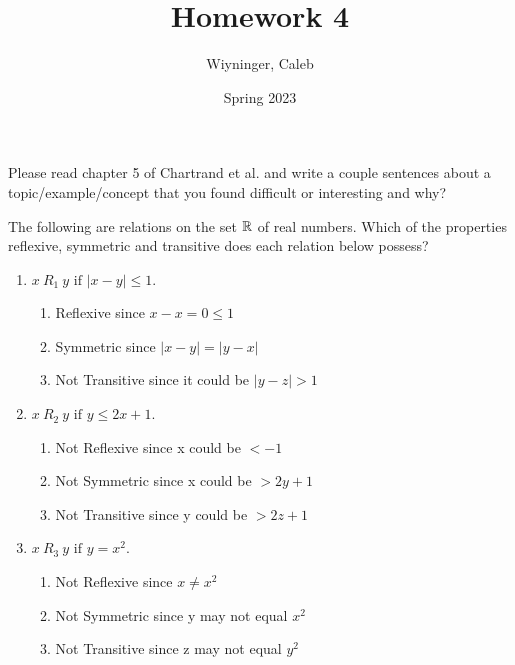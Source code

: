 \documentclass{homework}
\author{Wiyninger, Caleb}  %
\date{Spring 2023}  %
\title{Homework 4}
\begin{document}
 \maketitle

\question Please read chapter 5 of Chartrand et al. and write a couple sentences about a topic/example/concept that you found difficult or interesting and why?


\question The following are relations on the set $\mathbb{R}$ of real numbers. Which of the properties reflexive, symmetric and transitive does each relation below possess?
\begin{enumerate}[label=(\alph*)]
	\item $x \ R_1 \ y \text{ if } |x - y| \leq 1$.
        \begin{sol}
            \begin{enumerate}
                \item Reflexive since $x-x=0\leq1$
                \item Symmetric since $|x-y|=|y-x|$
                \item Not Transitive since it could be $|y-z|>1$
            \end{enumerate}
        \end{sol}
	\item $x \ R_2 \ y \text{ if } y \leq 2x + 1$.
        \begin{sol}
            \begin{enumerate}
              \item Not Reflexive since x could be $< -1$
              \item Not Symmetric since x could be $> 2y+1$
              \item Not Transitive since y could be $> 2z+1$
            \end{enumerate}
        \end{sol}
	\item $x \ R_3 \ y \text{ if } y = x^2$.
        \begin{sol}
            \begin{enumerate}
              \item Not Reflexive since $x\neq x^2$
              \item Not Symmetric since y may not equal $x^2$
              \item Not Transitive since z may not equal $y^2$
            \end{enumerate}

\end{sol}
\end{enumerate}
\end{document}
